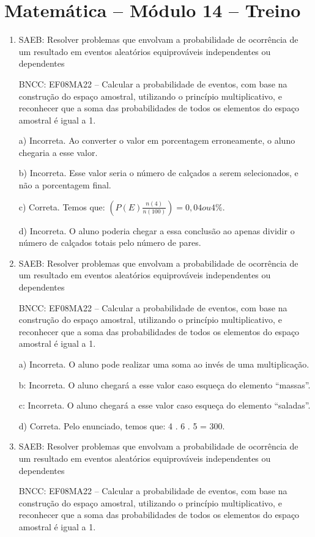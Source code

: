 \section*{Matemática – Módulo 14 – Treino}
\begin{enumerate}
\item SAEB: Resolver problemas que envolvam a probabilidade de ocorrência de
um resultado em eventos aleatórios equiprováveis independentes ou
dependentes

BNCC: EF08MA22 -- Calcular a probabilidade de eventos, com base na
construção do espaço amostral, utilizando o princípio multiplicativo, e
reconhecer que a soma das probabilidades de todos os elementos do espaço
amostral é igual a 1.

a) Incorreta. Ao converter o valor em porcentagem erroneamente, o
aluno chegaria a esse valor.

b) Incorreta. Esse valor seria o número de calçados a serem
selecionados, e não a porcentagem final.

c) Correta. Temos que: $(P(E)\frac{n(4)}{n(100)}) = 0,04 ou 4\%$.

d) Incorreta. O aluno poderia chegar a essa conclusão ao apenas
dividir o número de calçados totais pelo número de pares.
\item SAEB: Resolver problemas que envolvam a probabilidade de ocorrência de
um resultado em eventos aleatórios equiprováveis independentes ou
dependentes

BNCC: EF08MA22 -- Calcular a probabilidade de eventos, com base na
construção do espaço amostral, utilizando o princípio multiplicativo, e
reconhecer que a soma das probabilidades de todos os elementos do espaço
amostral é igual a 1.

a) Incorreta. O aluno pode realizar uma soma ao invés de uma
multiplicação.

b: Incorreta. O aluno chegará a esse valor caso esqueça do elemento
``massas''.

c: Incorreta. O aluno chegará a esse valor caso esqueça do elemento
``saladas''.

d) Correta. Pelo enunciado, temos que: 4 . 6 . 5 = 300.

\item SAEB: Resolver problemas que envolvam a probabilidade de ocorrência de
um resultado em eventos aleatórios equiprováveis independentes ou
dependentes

BNCC: EF08MA22 -- Calcular a probabilidade de eventos, com base na
construção do espaço amostral, utilizando o princípio multiplicativo, e
reconhecer que a soma das probabilidades de todos os elementos do espaço
amostral é igual a 1.


\end{enumerate}
